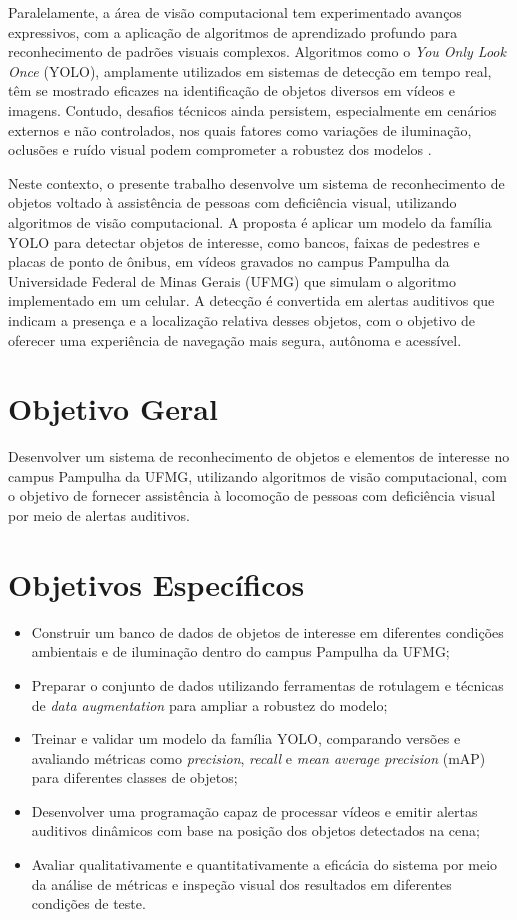 Paralelamente, a área de visão computacional tem experimentado avanços expressivos, com a aplicação de algoritmos de aprendizado profundo para reconhecimento de padrões visuais complexos. Algoritmos como o \textit{You Only Look Once} (YOLO), amplamente utilizados em sistemas de detecção em tempo real, têm se mostrado eficazes na identificação de objetos diversos em vídeos e imagens. Contudo, desafios técnicos ainda persistem, especialmente em cenários externos e não controlados, nos quais fatores como variações de iluminação, oclusões e ruído visual podem comprometer a robustez dos modelos \cite{gautam2021}.

Neste contexto, o presente trabalho desenvolve um sistema de reconhecimento de objetos voltado à assistência de pessoas com deficiência visual, utilizando algoritmos de visão computacional. A proposta é aplicar um modelo da família YOLO para detectar objetos de interesse, como bancos, faixas de pedestres e placas de ponto de ônibus, em vídeos gravados no campus Pampulha da Universidade Federal de Minas Gerais (UFMG) que simulam o algoritmo implementado em um celular. A detecção é convertida em alertas auditivos que indicam a presença e a localização relativa desses objetos, com o objetivo de oferecer uma experiência de navegação mais segura, autônoma e acessível.

\section{\textbf{Objetivo Geral}}

Desenvolver um sistema de reconhecimento de objetos e elementos de interesse no campus Pampulha da UFMG, utilizando algoritmos de visão computacional, com o objetivo de fornecer assistência à locomoção de pessoas com deficiência visual por meio de alertas auditivos.

\section{\textbf{Objetivos Específicos}}

\begin{itemize}
\item	Construir um banco de dados de objetos de interesse em diferentes condições ambientais e de iluminação dentro do campus Pampulha da UFMG;
\item	Preparar o conjunto de dados utilizando ferramentas de rotulagem e técnicas de \textit{data augmentation} para ampliar a robustez do modelo;
\item	Treinar e validar um modelo da família YOLO, comparando versões e avaliando métricas como \textit{precision}, \textit{recall} e \textit{mean average precision} (mAP) para diferentes classes de objetos;
\item	Desenvolver uma programação capaz de processar vídeos e emitir alertas auditivos dinâmicos com base na posição dos objetos detectados na cena;
\item   Avaliar qualitativamente e quantitativamente a eficácia do sistema por meio da análise de métricas e inspeção visual dos resultados em diferentes condições de teste.

\end{itemize}
